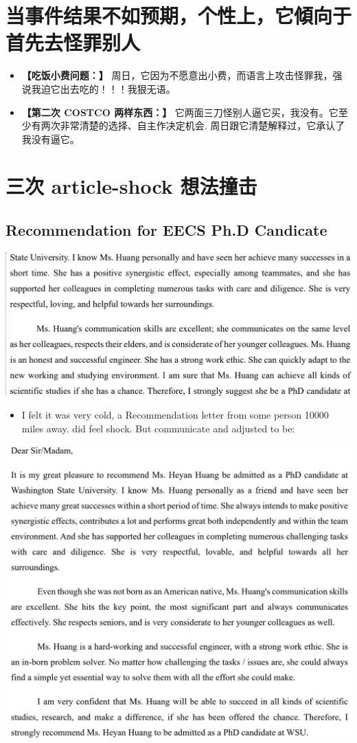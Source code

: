 \documentclass[9pt, b5paper]{article}
\begin{document}
\section{当事件结果不如预期，个性上，它傾向于首先去怪罪别人}
\label{sec-6}
\begin{itemize}
\item \textbf{【吃饭小费问题：】} 周日，它因为不愿意出小费，而语言上攻击怪罪我，强说我迫它出去吃的！！！我狠无语。
\item \textbf{【第二次 COSTCO 两样东西：】} 它两面三刀怪别人逼它买，我没有。它至少有两次非常清楚的选择、自主作决定机会. 周日跟它清楚解释过，它承认了我没有逼它。
\end{itemize}

\section{三次 article-shock 想法撞击}
\label{sec-7}
\subsection{Recommendation for EECS Ph.D Candicate}
\label{sec-7-1}

\includegraphics[width=.9\linewidth]{./pic/readme2_20230329_114352.png}
\begin{itemize}
\item I felt it was very cold, a Recommendation letter from some person 10000 miles away. did feel shock. But communicate and adjusted to be:
\end{itemize}

\includegraphics[width=.9\linewidth]{./pic/readme2_20230329_092732.png}
\end{document}
